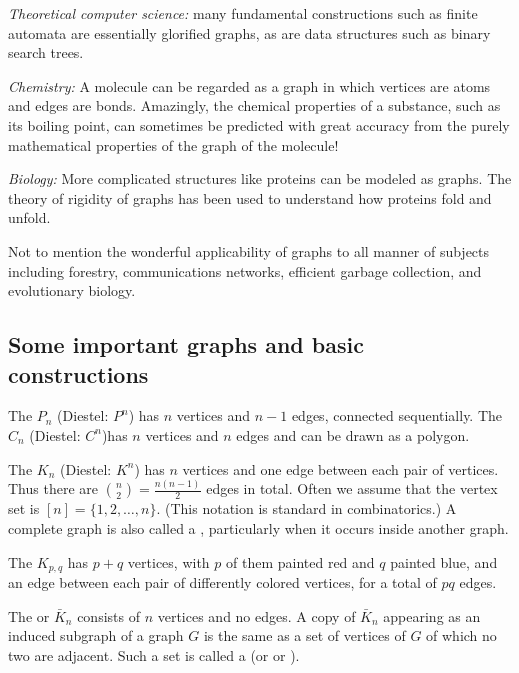\emph{Theoretical computer science:} many fundamental constructions such as finite automata are essentially glorified graphs, as are data structures such as binary search trees.

\emph{Chemistry:} A molecule can be regarded as a graph in which vertices are atoms and edges are bonds.  Amazingly, the chemical properties of a substance, such as its boiling point, can sometimes be predicted with great accuracy from the purely mathematical properties of the graph of the molecule!

\emph{Biology:} More complicated structures like proteins can be modeled as graphs.  The theory of rigidity of graphs has been used to understand how proteins fold and unfold.

Not to mention the wonderful applicability of graphs to all manner of subjects including forestry, communications networks, efficient garbage collection, and evolutionary biology.

\subsection{Some important graphs and basic constructions}

The  $P_n$ (Diestel: $P^n$) has $n$ vertices and $n-1$ edges, connected sequentially.
The  $C_n$ (Diestel: $C^n$)has $n$ vertices and $n$ edges and can be drawn as a polygon.


The  $K_n$ (Diestel: $K^n$) has $n$ vertices and one edge between each pair of vertices.  Thus there are $\binom{n}{2}=\frac{n(n-1)}{2}$ edges in total.  Often we assume that the vertex set is $[n]=\{1,2,\dots,n\}$.  (This notation is standard in combinatorics.)  A complete graph is also called a , particularly
when it occurs inside another graph.

The  $K_{p,q}$ has $p+q$ vertices, with $p$ of them painted red and $q$ painted blue, and an edge between each pair of differently colored vertices, for a total of $pq$ edges.


The  or $\bar K_n$ consists of $n$ vertices and no edges.  A copy of $\bar K_n$ appearing as an induced subgraph of a graph $G$ is the same as a set of vertices of $G$ of which no two are adjacent.  Such a set is called a  (or  or ).

